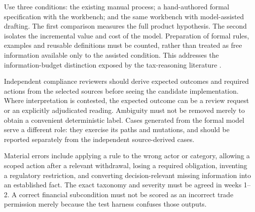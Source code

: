 Use three conditions: the existing manual process; a hand-authored formal
specification with the workbench; and the same workbench with model-assisted
drafting. The first comparison measures the full product hypothesis. The second
isolates the incremental value and cost of the model. Preparation of formal
rules, examples and reusable definitions must be counted, rather than treated as
free information available only to the assisted condition. This addresses the
information-budget distinction exposed by the tax-reasoning literature
\citep{jurayj2026}.

Independent compliance reviewers should derive expected outcomes and required
actions from the selected sources before seeing the candidate implementation.
Where interpretation is contested, the expected outcome can be a review request
or an explicitly adjudicated reading. Ambiguity must not be removed merely to
obtain a convenient deterministic label. Cases generated from the formal model
serve a different role: they exercise its paths and mutations, and should be
reported separately from the independent source-derived cases.

Material errors include applying a rule to the wrong actor or category, allowing
a scoped action after a relevant withdrawal, losing a required obligation,
inventing a regulatory restriction, and converting decision-relevant missing
information into an established fact. The exact taxonomy and severity must be
agreed in weeks 1--2. A correct financial subcondition must not be scored as an
incorrect trade permission merely because the test harness confuses those outputs.

